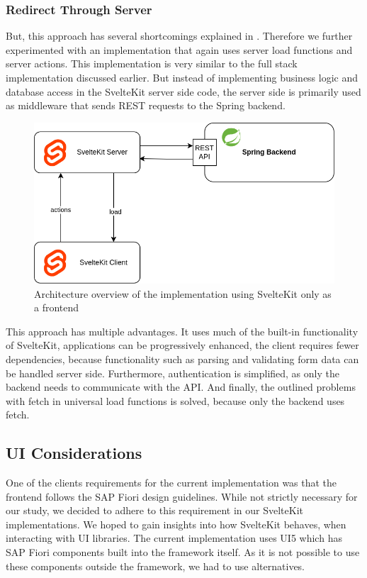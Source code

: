 \subsubsection{Redirect Through Server}
\label{sec:implementation-redirect}

But, this approach has several shortcomings explained in . Therefore we further experimented with an implementation that again uses server load functions and server actions. This implementation is very similar to the full stack implementation discussed earlier. But instead of implementing business logic and database access in the SvelteKit server side code, the server side is primarily used as middleware that sends REST requests to the Spring backend.

\begin{figure}[ht]
    \centering
    \includegraphics[width=.6\linewidth]{assets/fe-only-all-server}
    \caption{Architecture overview of the implementation using SvelteKit only as a frontend}
    \label{fig:dswfd-architecture-fe-through-server}
\end{figure}

This approach has multiple advantages. It uses much of the built-in functionality of SvelteKit, applications can be progressively enhanced, the client requires fewer dependencies, because functionality such as parsing and validating form data can be handled server side. Furthermore, authentication is simplified, as only the backend needs to communicate with the API. And finally, the outlined problems with fetch in universal load functions is solved, because only the backend uses fetch.


\subsection{UI Considerations}
\label{sec:implementation-ui}

One of the clients requirements for the current implementation was that the frontend follows the SAP Fiori design guidelines. While not strictly necessary for our study, we decided to adhere to this requirement in our SvelteKit implementations. We hoped to gain insights into how SvelteKit behaves, when interacting with UI libraries. The current implementation uses UI5 which has SAP Fiori components built into the framework itself. As it is not possible to use these components outside the framework, we had to use alternatives.   

